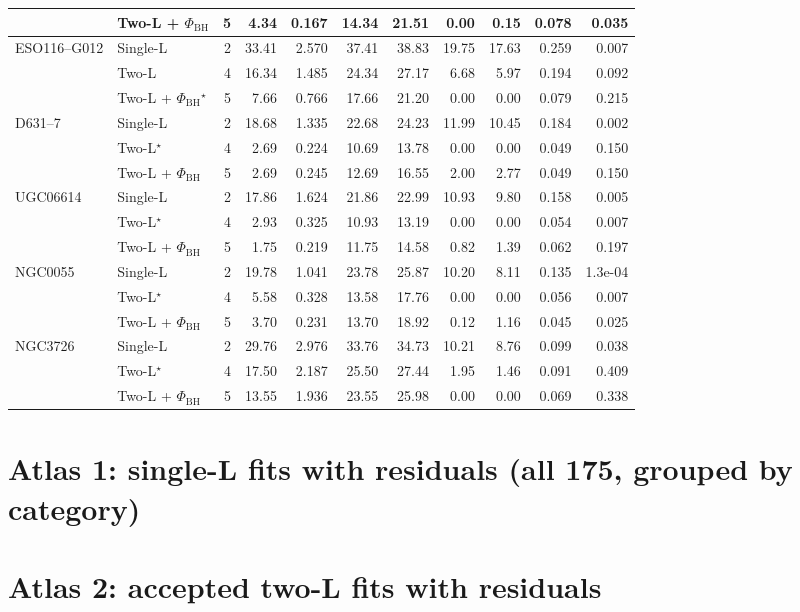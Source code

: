 \documentclass[9pt]{extarticle}
\begin{document}
{\begin{longtable}{llrrrrrrrrr}
 & Two-L + $\Phi_\mathrm{BH}$ & 5 & 4.34 & 0.167 & 14.34 & 21.51 & 0.00 & 0.15 & 0.078 & 0.035\\
\midrule
ESO116--G012 & Single-L & 2 & 33.41 & 2.570 & 37.41 & 38.83 & 19.75 & 17.63 & 0.259 & 0.007\\
 & Two-L & 4 & 16.34 & 1.485 & 24.34 & 27.17 & 6.68 & 5.97 & 0.194 & 0.092\\
 & Two-L + $\Phi_\mathrm{BH}$$^\star$ & 5 & 7.66 & 0.766 & 17.66 & 21.20 & 0.00 & 0.00 & 0.079 & 0.215\\
\midrule
D631--7 & Single-L & 2 & 18.68 & 1.335 & 22.68 & 24.23 & 11.99 & 10.45 & 0.184 & 0.002\\
 & Two-L$^\star$ & 4 & 2.69 & 0.224 & 10.69 & 13.78 & 0.00 & 0.00 & 0.049 & 0.150\\
 & Two-L + $\Phi_\mathrm{BH}$ & 5 & 2.69 & 0.245 & 12.69 & 16.55 & 2.00 & 2.77 & 0.049 & 0.150\\
\midrule
UGC06614 & Single-L & 2 & 17.86 & 1.624 & 21.86 & 22.99 & 10.93 & 9.80 & 0.158 & 0.005\\
 & Two-L$^\star$ & 4 & 2.93 & 0.325 & 10.93 & 13.19 & 0.00 & 0.00 & 0.054 & 0.007\\
 & Two-L + $\Phi_\mathrm{BH}$ & 5 & 1.75 & 0.219 & 11.75 & 14.58 & 0.82 & 1.39 & 0.062 & 0.197\\
\midrule
NGC0055 & Single-L & 2 & 19.78 & 1.041 & 23.78 & 25.87 & 10.20 & 8.11 & 0.135 & 1.3e-04\\
 & Two-L$^\star$ & 4 & 5.58 & 0.328 & 13.58 & 17.76 & 0.00 & 0.00 & 0.056 & 0.007\\
 & Two-L + $\Phi_\mathrm{BH}$ & 5 & 3.70 & 0.231 & 13.70 & 18.92 & 0.12 & 1.16 & 0.045 & 0.025\\
\midrule
NGC3726 & Single-L & 2 & 29.76 & 2.976 & 33.76 & 34.73 & 10.21 & 8.76 & 0.099 & 0.038\\
 & Two-L$^\star$ & 4 & 17.50 & 2.187 & 25.50 & 27.44 & 1.95 & 1.46 & 0.091 & 0.409\\
 & Two-L + $\Phi_\mathrm{BH}$ & 5 & 13.55 & 1.936 & 23.55 & 25.98 & 0.00 & 0.00 & 0.069 & 0.338\\

\end{longtable}}
\clearpage\section*{Atlas 1: single-L fits with residuals (all 175, grouped by category)}

\section*{Atlas 2: accepted two-L fits with residuals}

\end{document}
